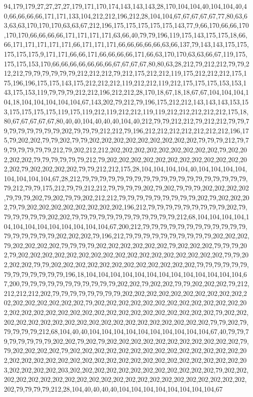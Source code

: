 94,179,179,27,27,27,27,179,171,170,174,143,143,143,28,170,104,104,40,104,104,40,40,66,66,66,66,171,171,133,104,212,212,196,212,28,104,104,67,67,67,67,67,77,80,63,63,63,63,170,170,170,63,63,67,212,196,175,175,175,175,175,143,77,9,66,170,66,66,170,170,170,66,66,66,66,171,171,171,171,63,66,40,79,79,196,119,175,143,175,175,18,66,66,171,171,171,171,171,66,171,171,171,66,66,66,66,66,63,66,137,79,143,143,175,175,175,175,175,9,171,171,66,66,171,66,66,66,66,171,66,63,170,170,63,63,66,67,119,175,175,175,153,170,66,66,66,66,66,66,66,67,67,67,67,80,80,63,28,212,79,212,212,79,79,212,212,79,79,79,79,79,79,212,212,212,79,212,175,212,212,119,175,212,212,212,175,175,196,196,175,175,143,175,212,212,212,119,212,212,119,212,175,175,175,153,153,143,175,153,119,79,79,79,212,212,196,212,212,28,170,18,67,18,18,67,67,104,104,104,104,18,104,104,104,104,104,67,143,202,79,212,79,196,175,212,212,143,143,143,153,153,175,175,175,175,119,175,119,212,119,212,212,119,119,212,212,212,212,212,175,18,80,67,67,67,67,67,80,40,40,104,40,40,40,104,40,212,79,79,212,212,79,212,212,79,79,79,79,79,79,79,79,79,202,79,79,79,212,212,79,196,212,212,212,212,212,212,212,196,175,79,202,202,79,79,202,79,79,202,202,202,202,202,202,202,202,202,79,79,79,212,79,79,79,79,79,79,79,212,79,202,212,212,202,202,202,202,202,202,202,202,202,79,202,202,202,202,79,79,79,79,79,79,212,79,202,202,202,202,202,202,202,202,202,202,202,202,202,79,202,202,202,202,79,79,212,212,175,28,104,104,104,104,40,104,104,104,104,104,104,104,104,67,28,212,79,79,79,79,79,79,79,79,79,79,79,79,79,79,79,79,79,79,79,79,212,79,79,175,212,79,79,212,212,79,79,79,79,202,79,202,79,79,79,202,202,202,202,79,79,79,202,79,202,79,79,202,212,212,79,79,79,79,79,79,79,79,79,202,79,202,202,202,79,79,202,202,202,202,202,202,202,202,196,212,79,79,79,79,79,79,79,79,79,202,79,79,79,79,79,79,202,202,79,79,79,79,79,79,79,79,79,79,79,79,212,68,104,104,104,104,104,104,104,104,104,104,104,104,104,67,200,212,79,79,79,79,79,79,79,79,79,79,79,79,79,79,79,79,79,79,202,202,202,79,196,212,79,79,79,79,79,79,79,79,79,79,202,202,202,79,202,202,202,202,79,79,79,79,202,202,202,202,202,202,79,202,202,202,79,79,79,202,79,202,202,202,202,202,202,202,202,202,202,202,202,202,202,202,202,202,79,79,202,202,202,79,79,202,202,202,202,202,202,202,202,202,202,202,202,79,79,79,79,79,79,79,79,79,79,79,79,79,196,18,104,104,104,104,104,104,104,104,104,104,104,104,104,67,200,79,79,79,79,79,79,79,79,79,79,79,202,202,79,202,202,79,79,202,202,202,79,212,212,212,212,202,79,79,79,79,79,79,79,79,202,202,202,202,202,202,202,202,202,202,202,202,202,202,202,202,202,79,202,202,202,202,202,202,202,202,202,202,202,202,202,202,202,202,202,202,202,202,202,202,202,202,202,202,202,202,202,202,79,202,202,202,202,202,202,202,202,202,202,202,202,202,202,202,202,202,202,202,79,79,202,79,79,79,79,79,212,68,104,40,40,104,104,104,104,104,104,104,104,104,104,67,40,79,79,79,79,79,79,79,79,202,202,79,202,79,202,202,202,202,202,202,202,202,202,202,202,79,79,202,202,202,202,79,202,202,202,202,202,202,202,202,202,202,202,202,202,202,202,202,202,202,202,202,202,202,202,202,202,202,202,202,202,202,202,202,202,202,203,202,202,202,202,203,202,202,202,202,202,202,202,202,202,202,202,202,79,202,202,202,202,202,202,202,202,202,202,202,202,202,202,202,202,202,202,202,202,202,202,202,79,79,79,79,212,28,104,40,40,40,40,104,104,104,104,104,104,104,104,67